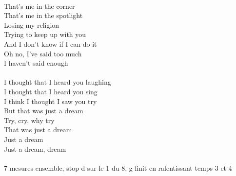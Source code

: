 \begin{multicols}{2}
    \columnbreak

    {\\
    That's me in the corner\\
    That's me in the spotlight\\
    Losing my religion\\
    Trying to keep up with you\\
    And I don't know if I can do it\\
    Oh no, I've said too much\\
    I haven't said enough\\
    }
    {\\
    I thought that I heard you laughing\\
    I thought that I heard you sing\\
    I think I thought I saw you try\\
    But that was just a dream\\
    Try, cry, why try\\
    That was just a dream\\
    Just a dream\\
    Just a dream, dream\\
    }
    {\\7 mesures ensemble, stop d sur le 1 du 8, g finit en ralentissant temps 3 et 4}


\end{multicols}